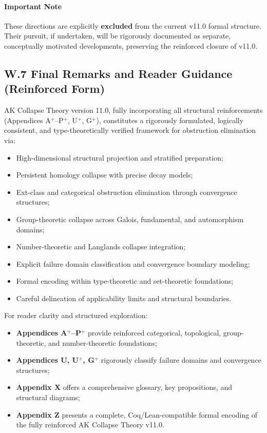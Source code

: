 \documentclass[11pt]{article}
\begin{document}
\paragraph{Important Note}  
These directions are explicitly \textbf{excluded} from the current v11.0 formal structure. Their pursuit, if undertaken, will be rigorously documented as separate, conceptually motivated developments, preserving the reinforced closure of v11.0.

\subsection*{W.7 Final Remarks and Reader Guidance (Reinforced Form)}

AK Collapse Theory version 11.0, fully incorporating all structural reinforcements (Appendices A$^{+}$–P$^{+}$, U$^{+}$, G$^{+}$), constitutes a rigorously formulated, logically consistent, and type-theoretically verified framework for obstruction elimination via:

\begin{itemize}
    \item High-dimensional structural projection and stratified preparation;
    \item Persistent homology collapse with precise decay models;
    \item Ext-class and categorical obstruction elimination through convergence structures;
    \item Group-theoretic collapse across Galois, fundamental, and automorphism domains;
    \item Number-theoretic and Langlands collapse integration;
    \item Explicit failure domain classification and convergence boundary modeling;
    \item Formal encoding within type-theoretic and set-theoretic foundations;
    \item Careful delineation of applicability limits and structural boundaries.
\end{itemize}

For reader clarity and structured exploration:

\begin{itemize}
    \item \textbf{Appendices A$^{+}$–P$^{+}$} provide reinforced categorical, topological, group-theoretic, and number-theoretic foundations;
    \item \textbf{Appendices U, U$^{+}$, G$^{+}$} rigorously classify failure domains and convergence structures;
    \item \textbf{Appendix X} offers a comprehensive glossary, key propositions, and structural diagrams;
    \item \textbf{Appendix Z} presents a complete, Coq/Lean-compatible formal encoding of the fully reinforced AK Collapse Theory v11.0.
\end{itemize}
\end{document}
